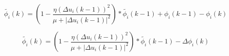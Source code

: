 \documentclass[journal,onecolumn]{IEEEtran}
\begin{document}
\begin{equation}
    \label{model 21}
    \tilde{\phi_i}(k) = (1-\frac{\eta(\Delta u_i(k-1))^2}{\mu + |\Delta u_i(k-1)|^2})*\tilde{\phi_i}(k-1) + \phi_i(k-1) - \phi_i(k)
\end{equation}

\begin{equation}
    \label{model 22}
    \tilde{\phi_i}(k) = (1-\frac{\eta(\Delta u_i(k-1))^2}{\mu + |\Delta u_i(k-1)|^2})*\tilde{\phi_i}(k-1) - \Delta \phi_i(k)
\end{equation}










\end{document}
